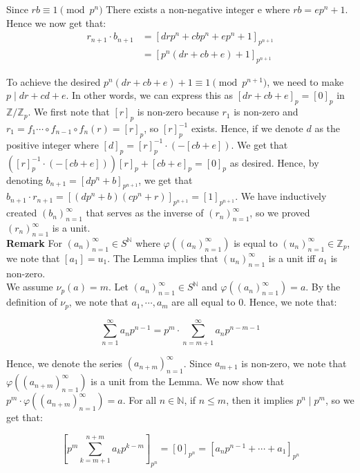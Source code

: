 \documentclass{article}
\begin{document}
\begin{enumerate}
\begin{enumerate}
    Since $rb \equiv 1 \pmod {p^n}$ There exists a non-negative integer e where $rb = ep^n + 1$. Hence we now get that: 
    \begin{align*}
        r_{n+1} \cdot b_{n+1} &= [drp^n + cbp^n + ep^n + 1]_{p^{n+1}} \\
        &= [p^n(dr + cb + e) + 1]_{p^{n+1}}
    \end{align*}

    To achieve the desired $p^n(dr + cb + e) + 1 \equiv 1 \pmod {p^{n+1}}$, we need to make $p \mid dr + cd + e$. In other words, we can express this as $[dr + cb + e]_p = [0]_p$ in $\mathbb{Z}/\mathbb{Z}_p$. We first note that $[r]_p$ is non-zero because $r_1$ is non-zero and $r_1 = f_1 \cdots \circ f_{n-1} \circ f_n (r) = [r]_p$, so $[r]_p^{-1}$ exists. Hence, if we denote $d$ as the positive integer where $[d]_p = [r]_p^{-1} \cdot (-[cb + e])$. We get that $([r]_p^{-1} \cdot (-[cb + e]))[r]_p + [cb + e]_p = [0]_p$ as desired. Hence, by denoting $b_{n+1} = [dp^n + b]_{p^{n+1}}$, we get that $b_{n+1} \cdot r_{n+1} = [(dp^n + b)(cp^n + r)]_{p^{n+1}} = [1]_{p^{n+1}}$. We have inductively created $(b_n)^{\infty}_{n=1}$ that serves as the inverse of $(r_n)^{\infty}_{n=1}$, so we proved $(r_n)^{\infty}_{n=1}$ is a unit. \\

    \textbf{Remark} For $(a_n)^{\infty}_{n=1} \in S^{\mathbb{N}}$ where $\varphi((a_n)^{\infty}_{n=1})$ is equal to $(u_n)^{\infty}_{n=1} \in \mathbb{Z}_p$, we note that $[a_1] = u_1$. The Lemma implies that $(u_n)^{\infty}_{n=1}$ is a unit iff $a_1$ is non-zero. \\

    We assume $\nu_p(a) = m$. Let $(a_n)^{\infty}_{n=1} \in S^{\mathbb{N}}$ and $\varphi((a_n)^{\infty}_{n=1}) = a$. By the definition of $\nu_p$, we note that $a_1, \cdots, a_{m}$ are all equal to 0. Hence, we note that:

    $$\sum^{\infty}_{n= 1} a_n p^{n-1} = p^m \cdot \sum^{\infty}_{n= m + 1} a_n p^{n-m-1}$$ 
    
    Hence, we denote the series $(a_{n+m})^{\infty}_{n=1}$. Since $a_{m+1}$ is non-zero, we note that $\varphi((a_{n+m})^{\infty}_{n=1})$ is a unit from the Lemma. We now show that $p^m \cdot \varphi((a_{n+m})^{\infty}_{n=1}) = a$. For all $n \in \mathbb{N}$, if $n \leq m$, then it implies $p^n \mid p^m$, so we get that: 


    $$[p^m \sum^{n+m}_{k = m+1}a_kp^{k-m}]_{p^n} = [0]_{p^n} = [a_np^{n-1} + \cdots + a_1]_{p^n}$$


\end{enumerate}
\end{enumerate}
\end{document}
